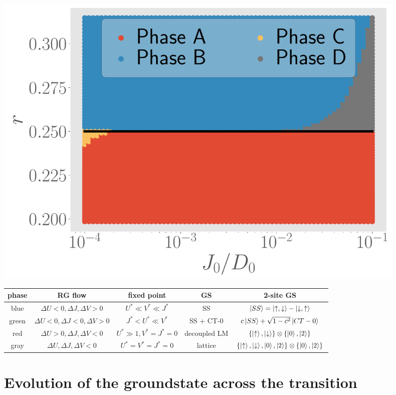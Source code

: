 \documentclass{report}
\numberwithin{equation}{section}
\begin{document}
\begin{center}
	\includegraphics[width=0.9\textwidth]{../figures/phase-map-MIT.pdf}
\end{center}

\begin{center}
\begin{tabular}{|c|c|c|c|c|}
\hline
phase & RG flow & fixed point & GS & 2-site GS \\ 
\hline
blue & \(\Delta U <0, \Delta J,\Delta V>0\) & \(U^* \ll V^* \ll J^*\) & SS & \(\ket{SS}=\ket{\uparrow,\downarrow} - \ket{\downarrow, \uparrow}\)  \\ 
green &  \(\Delta U < 0, \Delta J < 0,\Delta V>0\) & \(J^* < U^* \ll V^*\) & SS + CT-0 & \(c\ket{SS} + \sqrt{1-c^2}\ket{CT-0}\)  \\  
red &  \(\Delta U > 0, \Delta J,\Delta V<0\) & \(U^* \gg 1,  V^* = J^* = 0\) & decoupled LM & \(\left\{\ket{\uparrow}, \ket{\downarrow} \right\} \otimes \left\{\ket{0}, \ket{2}\right\} \) \\
gray &  \(\Delta U, \Delta J,\Delta V < 0\) & \(U^* = V^* = J^* = 0\) & lattice & \(\left\{\ket{\uparrow}, \ket{\downarrow}, \ket{0}, \ket{2} \right\} \otimes \left\{\ket{0}, \ket{2}\right\}\) \\
\hline
\end{tabular}
\end{center}

\section{Evolution of the groundstate across the transition}
\end{document}
